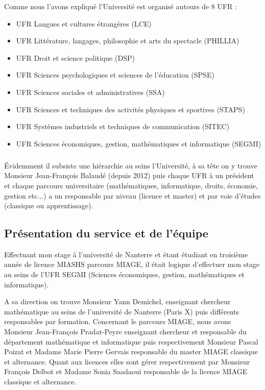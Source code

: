\documentclass[a4paper, 12pt, twoside]{article}
\begin{document}
Comme nous l'avons expliqué l'Université est organisé autours de 8 UFR : \vspace{0.4 cm}
\begin{itemize}
\item UFR Langues et cultures étrangères \textsf{(LCE)} 
\item UFR Littérature, langages, philosophie et arts du spectacle \textsf{(PHILLIA)}
\item UFR Droit et science politique \textsf{(DSP)}
\item UFR Sciences psychologiques et sciences de l'éducation \textsf{(SPSE)}
\item UFR Sciences sociales et administratives \textsf{(SSA)}
\item UFR Sciences et techniques des activités physiques et sportives \textsf{(STAPS)}
\item UFR Systèmes industriels et techniques de communication \textsf{(SITEC)}
\item UFR Sciences économiques, gestion, mathématiques et informatique \textsf{(SEGMI)} 
\end{itemize}
\subparagraph*{}{Évidemment il subsiste une hiérarchie au seins l'Université, à sa tête on y trouve Monsieur \textsf{Jean-François Balaudé} (depuis 2012) puis chaque UFR à un président et chaque parcours universitaire (mathématiques, informatique, droits, économie, gestion etc...)  a un responsable par niveau (licence et master) et par voie d'études (classique ou apprentissage).}

\subsection{Présentation du service et de l'équipe}
Effectuant mon stage à l'université de Nanterre et étant étudiant en troisième année de licence MIASHS parcours MIAGE, il était logique d'effectuer mon stage au seins de l'UFR \textsf{SEGMI} (Sciences économiques, gestion, mathématiques et informatique). \newline

A sa direction on trouve Monsieur \textsf{Yann Demichel}, enseignant chercheur mathématique au seins de l'université de Nanterre (Paris X) puis différents responsables par formation. Concernant le parcours MIAGE, nous avons Monsieur \textsf{Jean-François Pradat-Peyre} enseignant chercheur et responsable du département mathématique et informatique puis respectivement Monsieur \textsf{Pascal Poizat} et Madame \textsf{Marie Pierre Gervais} responsable du master MIAGE classique et alternance. Quant aux licences elles sont gérer respectivement par Monsieur \textsf{François Delbot} et Madame \textsf{Sonia Saadaoui} responsable de la licence MIAGE classique et alternance. \newline
\end{document}

